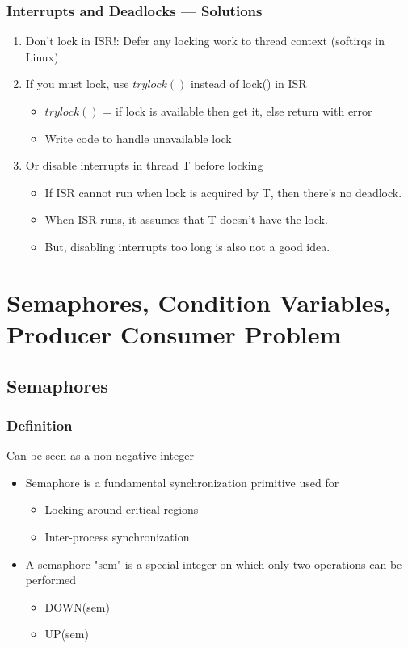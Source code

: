 \documentclass[12pt]{article}
\begin{document}
\subsubsection{Interrupts and Deadlocks — Solutions}
\begin{enumerate}
    \item Don’t lock in ISR!: Defer any locking work to thread context (softirqs in Linux)
    \item If you must lock, use {$try lock()$} instead of lock() in ISR \begin{itemize}
        \item {$try lock()$} = if lock is available then get it, else return with error
        \item Write code to handle unavailable lock
    \end{itemize}
    \item Or disable interrupts in thread T before locking \begin{itemize}
        \item If ISR cannot run when lock is acquired by T, then there’s no deadlock.
        \item When ISR runs, it assumes that T doesn’t have the lock.
        \item But, disabling interrupts too long is also not a good idea.
    \end{itemize}
\end{enumerate}

\section{Semaphores, Condition Variables, Producer Consumer Problem}
\subsection{Semaphores}
\subsubsection{Definition}
Can be seen as a non-negative integer
\begin{itemize}
    \item Semaphore is a fundamental synchronization primitive used for \begin{itemize}
        \item Locking around critical regions 
        \item Inter-process synchronization
    \end{itemize}
    \item A semaphore "sem" is a special integer on which only two operations can be performed \begin{itemize}
        \item DOWN(sem)
        \item UP(sem)
    \end{itemize}
\end{itemize}
\end{document}
